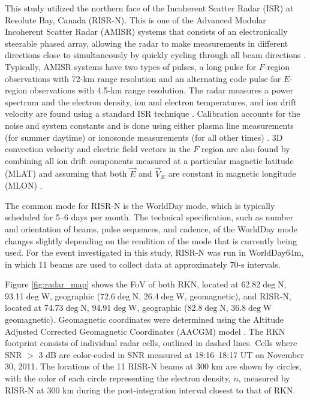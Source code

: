 This study utilized the northern face of the Incoherent Scatter Radar (ISR) at Resolute Bay, Canada (RISR-N).  This is one of the Advanced Modular Incoherent Scatter Radar (AMISR) systems that consists of an electronically steerable phased array, allowing the radar to make measurements in different directions close to simultaneously by quickly cycling through all beam directions \citep{Bahcivan2010}.  Typically, AMISR systems have two types of pulses, a long pulse for \(F\)-region observations with 72-km range resolution and an alternating code pulse for \(E\)-region observations with 4.5-km range resolution.  The radar measures a power spectrum and the electron density, ion and electron temperatures, and ion drift velocity are found using a standard ISR technique \citep{Evans1969,Rishbeth1985,Nicolls2007a}.  Calibration accounts for the noise and system constants \citep{Nicolls2007a} and is done using either plasma line measurements (for summer daytime) or ionosonde measurements (for all other times) \citep{Bahcivan2010,Themens2014}.  3D convection velocity and electric field vectors in the $F$ region are also found by combining all ion drift components measured at a particular magnetic latitude (MLAT) and assuming that both \(\vec{E}\) and \(\vec{V}_E\) are constant in magnetic longitude (MLON) \citep{Heinselman2008}.

The common mode for RISR-N is the WorldDay mode, which is typically scheduled for 5--6 days per month.  The technical specification, such as number and orientation of beams, pulse sequences, and cadence, of the WorldDay mode changes slightly depending on the rendition of the mode that is currently being used.  For the event investigated in this study, RISR-N was run in WorldDay64m, in which 11 beams are used to collect data at approximately 70-s intervals.

Figure \ref{fig:radar_map} shows the FoV of both RKN, located at 62.82\(\deg\)N, 93.11\(\deg\)W, geographic (72.6\(\deg\)N, 26.4\(\deg\)W, geomagnetic), and RISR-N, located at 74.73\(\deg\)N, 94.91\(\deg\)W, geographic (82.8\(\deg\)N, 36.8\(\deg\)W geomagnetic).  Geomagnetic coordinates were determined using the Altitude Adjusted Corrected Geomagnetic Coordinates (AACGM) model \citep{Shepherd2014}.  The RKN footprint consists of individual radar cells, outlined in dashed lines.  Cells where SNR \(>\) 3 dB are color-coded in SNR measured at 18:16--18:17 UT on November 30, 2011. The locations of the 11 RISR-N beams at 300 km are shown by circles, with the color of each circle representing the electron density, \(n\), measured by RISR-N at 300 km during the post-integration interval closest to that of RKN.

